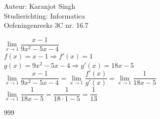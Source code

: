 \documentclass[a4paper]{article}
\begin{document}
	
\noindent\large Auteur: Karanjot Singh \\
\noindent\large Studierichting: Informatica \\
\noindent\large Oefeningenreeks 3C nr. 16.7 \\

\normalsize

$\displaystyle\lim\limits_{x \to 1} \dfrac{x - 1}{9x^2 - 5x - 4}$\\

$f(x) = x - 1 \Rightarrow f'(x) = 1$\\

$g(x) = 9x^2 - 5x - 4 \Rightarrow g'(x) = 18x - 5$\\

$\displaystyle\lim\limits_{x \to 1} \dfrac{x - 1}{9x^2 - 5x - 4} = \lim\limits_{x \to 1} \dfrac{f'(x)}{g'(x)} = \lim\limits_{x \to 1} \dfrac{1}{18x - 5}$\\

$\displaystyle\lim\limits_{x \to 1} \dfrac{1}{18x - 5} = \dfrac{1}{18 \cdot 1 - 5} = \dfrac{1}{13}$\\

\begin{thebibliography}{999}
\end{thebibliography}
\end{document}
